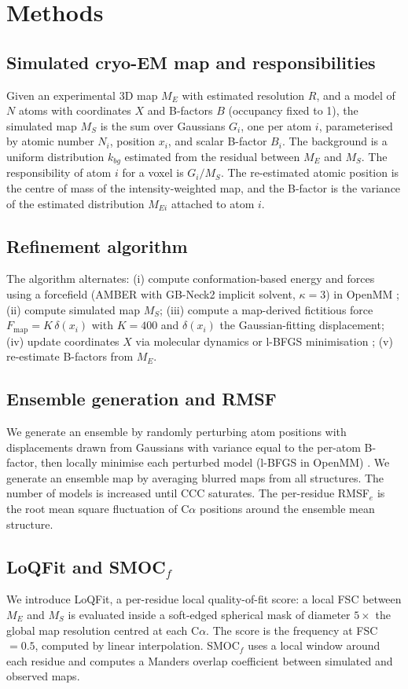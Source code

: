\documentclass[11pt]{article}
\begin{document}
\section{Methods}
\subsection{Simulated cryo-EM map and responsibilities}
Given an experimental 3D map $M_E$ with estimated resolution $R$, and a model of $N$ atoms with coordinates $X$ and B-factors $B$ (occupancy fixed to 1), the simulated map $M_S$ is the sum over Gaussians $G_i$, one per atom $i$, parameterised by atomic number $N_i$, position $x_i$, and scalar B-factor $B_i$. The background is a uniform distribution $k_{bg}$ estimated from the residual between $M_E$ and $M_S$. The responsibility of atom $i$ for a voxel is $G_i / M_S$. The re-estimated atomic position is the centre of mass of the intensity-weighted map, and the B-factor is the variance of the estimated distribution $M_{Ei}$ attached to atom $i$.

\subsection{Refinement algorithm}
The algorithm alternates: (i) compute conformation-based energy and forces using a forcefield (AMBER with GB-Neck2 implicit solvent, $\kappa=3$) in OpenMM \citep{r31}; (ii) compute simulated map $M_S$; (iii) compute a map-derived fictitious force $F_\text{map}=K\,\delta(x_i)$ with $K=400$ and $\delta(x_i)$ the Gaussian-fitting displacement; (iv) update coordinates $X$ via molecular dynamics or l-BFGS minimisation \citep{r30}; (v) re-estimate B-factors from $M_E$.

\subsection{Ensemble generation and RMSF}
We generate an ensemble by randomly perturbing atom positions with displacements drawn from Gaussians with variance equal to the per-atom B-factor, then locally minimise each perturbed model (l-BFGS in OpenMM) \citep{r31,r32}. We generate an ensemble map by averaging blurred maps from all structures. The number of models is increased until CCC saturates. The per-residue RMSF$_e$ is the root mean square fluctuation of C$\alpha$ positions around the ensemble mean structure.

\subsection{LoQFit and SMOC$_f$}
We introduce LoQFit, a per-residue local quality-of-fit score: a local FSC \citep{r53} between $M_E$ and $M_S$ is evaluated inside a soft-edged spherical mask of diameter $5\times$ the global map resolution centred at each C$\alpha$. The score is the frequency at FSC$=0.5$, computed by linear interpolation. SMOC$_f$ \citep{r33} uses a local window around each residue and computes a Manders overlap coefficient between simulated and observed maps.
\end{document}
